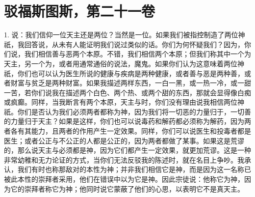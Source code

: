 
\section{驳福斯图斯，第二十一卷}

\par

1. 说：我们信仰一位天主还是两位？当然是一位。如果我们被指控制造了两位神祇，我回答说，从未有人能证明我们说过类似的话。你们为何怀疑我们？因为，你们说，我们相信善与恶两个本原。不错，我们相信两个本原；但我们称其中一个为天主，另一个为，或者用通常通俗的说法，魔鬼。如果你们认为这意味着两位神祇，你们也可以认为医生所说的健康与疾病是两种健康，或者善与恶是两种善，或者财富与贫乏是两种财富。如果我描述两样东西，一白一黑，或一热一冷，或一甜一苦，若你们说我在描述两个白色、两个热、或两个甜的东西，那就会显得像白痴或疯癫。同样，当我断言有两个本原，天主与时，你们没有理由说我相信两位神祇。你们是否认为我们必须两者都称为神，因为我们将一切恶的力量归于，一切善的力量归于天主？如果是这样，你们也可以说毒药和解药都必须称为解药，因为两者各有其能力，且两者的作用产生一定效果。同样，你们可以说医生和投毒者都是医生；或者公正与不公正的人都是公正的，因为两者都做了某事。如果这是荒谬的，那么说天主与必须都是神，因为它们都产生一定效果，就更加荒谬。这是一种非常幼稚和无力论证的方式，当你们无法反驳我的陈述时，就在名目上争吵。我承认，我们有时也称那敌对的本性为神；并非我们相信它是神，而是因为这一名称已被此本性的崇拜者采用，他们在错误中以为它是神。因此宗徒说：他称它为神，因为它的崇拜者称它为神；他同时说它蒙蔽了他们的心思，以表明它不是真天主。\par

